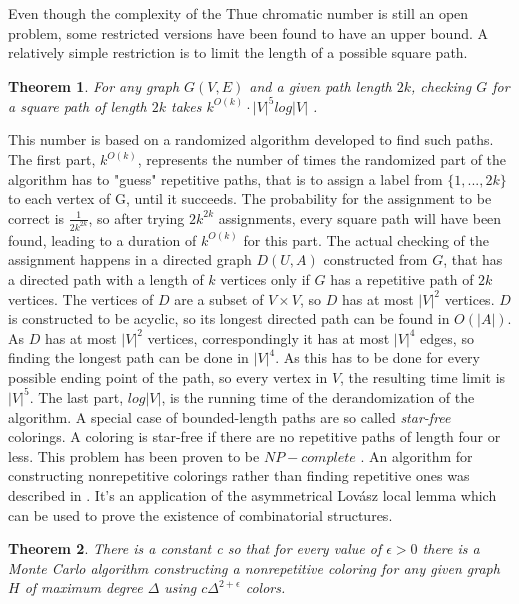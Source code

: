 \documentclass[12pt,a4paper]{article}
\newtheorem{theorem}{Theorem}
\begin{document}
Even though the complexity of the Thue chromatic number is still an open problem, some restricted versions have been found to have an upper bound. A relatively simple restriction is to limit the length of a possible square path.
\begin{theorem} 
For any graph $G(V, E)$ and a given path length $2k$, checking $G$ for a square path of length $2k$ takes $k^{O(k)} \cdot |V|^5 log |V|$ \citep{Marx2009}.
\end{theorem} 
This number is based on a randomized algorithm developed to find such paths. The first part, $k^{O(k)}$, represents the number of times the randomized part of the algorithm has to "guess" repetitive paths, that is to assign a label from $\{ 1, ..., 2k \}$ to each vertex of G, until it succeeds. The probability for the assignment to be correct is $\frac{1}{2k^{2k}}$, so after trying $2k^{2k}$ assignments, every square path will have been found, leading to a duration of $k^{O(k)}$ for this part. The actual checking of the assignment happens in a directed graph $D(U, A)$ constructed from $G$, that has a directed path with a length of $k$ vertices only if $G$ has a repetitive path of $2k$ vertices. The vertices of $D$ are a subset of $V \times V$, so $D$ has at most $|V|^2$ vertices. $D$ is constructed to be acyclic, so its longest directed path can be found in $O(|A|)$. As $D$ has at most $|V|^2$ vertices, correspondingly it has at most $|V|^4$ edges, so finding the longest path can be done in $|V|^4$. As this has to be done for every possible ending point of the path, so every vertex in $V$, the resulting time limit is $|V|^5$. The last part, $log |V|$, is the running time of the derandomization of the algorithm. 
\newline
A special case of bounded-length paths are so called \textit{star-free} colorings. A coloring is star-free if there are no repetitive paths of length four or less. This problem has been proven to be $NP-complete$ \citep{Coleman1984}.
\newpage
An algorithm for constructing nonrepetitive colorings rather than finding repetitive ones was described in \citep{Haeupler2010}. It's an application of the asymmetrical Lovász local lemma which can be used to prove the existence of combinatorial structures. 
\begin{theorem}
There is a constant c so that for every value of $\epsilon > 0$ there is a Monte Carlo algorithm constructing a nonrepetitive coloring for any given graph $H$ of maximum degree $\Delta$ using $c\Delta^{2+\epsilon}$ colors.  
\end{theorem}
\end{document}
